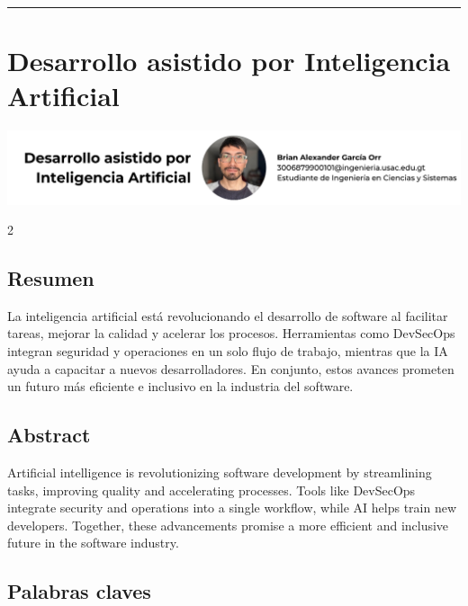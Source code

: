 \documentclass[12pt,spanish,Letterpaper,openany]{book}
\newcommand{\HRule}{\begin{center}\rule{0.5\linewidth}{0.2mm}\end{center}}
\begin{document}
\HRule

\medskip

\hypertarget{art07}{%
\chapter{Desarrollo asistido por Inteligencia Artificial}\label{art07}}

\begin{center}\includegraphics[width=1\linewidth]{autores/art07} \end{center}

\begin {multicols}{2}

\hypertarget{resumen-6}{%
\section{Resumen}\label{resumen-6}}

La inteligencia artificial está revolucionando el desarrollo de software al facilitar tareas, mejorar la calidad y acelerar los procesos. Herramientas como DevSecOps integran seguridad y operaciones en un solo flujo de trabajo, mientras que la IA ayuda a capacitar a nuevos desarrolladores. En conjunto, estos avances prometen un futuro más eficiente e inclusivo en la industria del software.

\hypertarget{abstract-6}{%
\section{Abstract}\label{abstract-6}}

Artificial intelligence is revolutionizing software development by streamlining tasks, improving quality and accelerating processes. Tools like DevSecOps integrate security and operations into a single workflow, while AI helps train new developers. Together, these advancements promise a more efficient and inclusive future in the software industry.

\hypertarget{palabras-claves-6}{%
\section{Palabras claves}\label{palabras-claves-6}}


\end{multicols}
\end{document}
